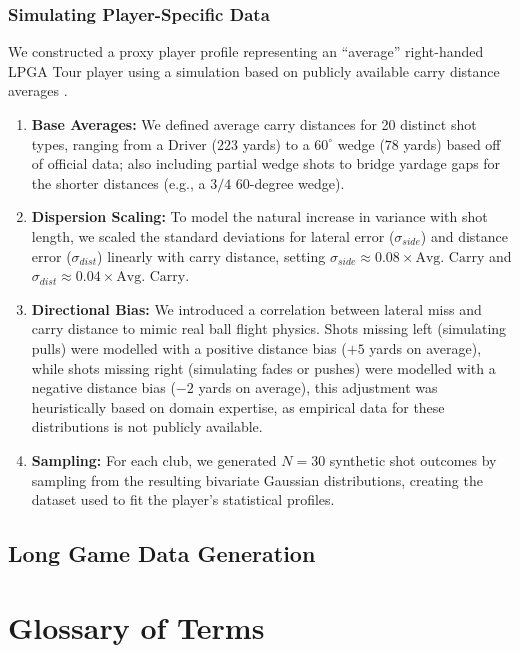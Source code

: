 \documentclass[11pt, letterpaper]{article}
\begin{document}
\subsubsection{Simulating Player-Specific Data}
\label{app: player-data}
We constructed a proxy player profile representing an ``average'' right-handed LPGA Tour player using a simulation based on publicly available carry distance averages \parencite{trackman2024averages}.
\begin{enumerate}\item 
\textbf{Base Averages:} We defined average carry distances for 20 distinct shot types, ranging from a Driver ($223$ yards) to a $60^{\circ}$ wedge ($78$ yards) based off of official data; also including partial wedge shots to bridge yardage gaps for the shorter distances (e.g., a $3/4$ 60-degree wedge). 
\item \textbf{Dispersion Scaling:} To model the natural increase in variance with shot length, we scaled the standard deviations for lateral error ($\sigma_{side}$) and distance error ($\sigma_{dist}$) linearly with carry distance, setting $\sigma_{side} \approx 0.08 \times \text{Avg. Carry}$ and $\sigma_{dist} \approx 0.04 \times \text{Avg. Carry}$. 
\item \textbf{Directional Bias:} We introduced a correlation between lateral miss and carry distance to mimic real ball flight physics. Shots missing left (simulating pulls) were modelled with a positive distance bias ($+5$ yards on average), while shots missing right (simulating fades or pushes) were modelled with a negative distance bias ($-2$ yards on average), this adjustment was heuristically based on domain expertise, as empirical data for these distributions is not publicly available.

\item \textbf{Sampling:} For each club, we generated $N=30$ synthetic shot outcomes by sampling from the resulting bivariate Gaussian distributions, creating the dataset used to fit the player's statistical profiles.
\end{enumerate}

\subsection{Long Game Data Generation}
\label{app: long-game data}


\section{Glossary of Terms}
\label{sec:Appendix2}
\end{document}
